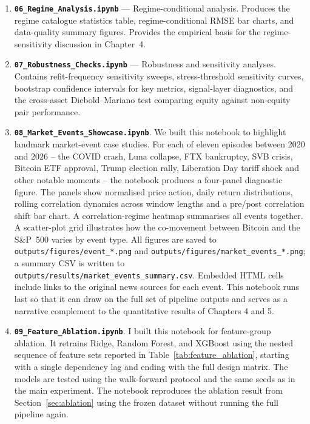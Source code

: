 \begin{enumerate}
    \item \textbf{\texttt{06\_Regime\_Analysis.ipynb}} --- Regime-conditional analysis. Produces the regime catalogue statistics table, regime-conditional RMSE bar charts, and data-quality summary figures. Provides the empirical basis for the regime-sensitivity discussion in Chapter~4.

    \item \textbf{\texttt{07\_Robustness\_Checks.ipynb}} --- Robustness and sensitivity analyses. Contains refit-frequency sensitivity sweeps, stress-threshold sensitivity curves, bootstrap confidence intervals for key metrics, signal-layer diagnostics, and the cross-asset Diebold--Mariano test comparing equity against non-equity pair performance.

    \item \textbf{\texttt{08\_Market\_Events\_Showcase.ipynb}}. We built this notebook to highlight landmark market-event case studies. For each of eleven episodes between 2020 and 2026 – the COVID crash, Luna collapse, FTX bankruptcy, SVB crisis, Bitcoin ETF approval, Trump election rally, Liberation Day tariff shock and other notable moments – the notebook produces a four-panel diagnostic figure. The panels show normalised price action, daily return distributions, rolling correlation dynamics across window lengths and a pre/post correlation shift bar chart. A correlation-regime heatmap summarises all events together. A scatter-plot grid illustrates how the co-movement between Bitcoin and the S\&P~500 varies by event type. All figures are saved to \texttt{outputs/figures/event\_*.png} and \texttt{outputs/figures/market\_events\_*.png}; a summary CSV is written to \texttt{outputs/results/market\_events\_summary.csv}. Embedded HTML cells include links to the original news sources for each event. This notebook runs last so that it can draw on the full set of pipeline outputs and serves as a narrative complement to the quantitative results of Chapters 4 and 5.

    \item \textbf{\texttt{09\_Feature\_Ablation.ipynb}}. I built this notebook for feature-group ablation. It retrains Ridge, Random Forest, and XGBoost using the nested sequence of feature sets reported in Table~\ref{tab:feature_ablation}, starting with a single dependency lag and ending with the full design matrix. The models are tested using the walk-forward protocol and the same seeds as in the main experiment. The notebook reproduces the ablation result from Section~\ref{sec:ablation} using the frozen dataset without running the full pipeline again.
\end{enumerate}


